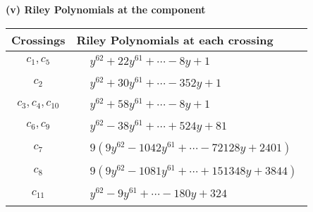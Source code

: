 \documentclass[1p]{elsarticle_modified}
\theoremstyle{definition}
\begin{document}
\flushleft \textbf{(v) Riley Polynomials at the component}\newline \\
\begin{tabular}{m{50pt}|m{274pt}}
Crossings & \hspace{64pt}Riley Polynomials at each crossing \\
\hline $$\begin{aligned}c_{1},c_{5}\end{aligned}$$&$\begin{aligned}
&y^{62}+22 y^{61}+\cdots-8 y+1
\end{aligned}$\\
\hline $$\begin{aligned}c_{2}\end{aligned}$$&$\begin{aligned}
&y^{62}+30 y^{61}+\cdots-352 y+1
\end{aligned}$\\
\hline $$\begin{aligned}c_{3},c_{4},c_{10}\end{aligned}$$&$\begin{aligned}
&y^{62}+58 y^{61}+\cdots-8 y+1
\end{aligned}$\\
\hline $$\begin{aligned}c_{6},c_{9}\end{aligned}$$&$\begin{aligned}
&y^{62}-38 y^{61}+\cdots+524 y+81
\end{aligned}$\\
\hline $$\begin{aligned}c_{7}\end{aligned}$$&$\begin{aligned}
&9(9 y^{62}-1042 y^{61}+\cdots-72128 y+2401)
\end{aligned}$\\
\hline $$\begin{aligned}c_{8}\end{aligned}$$&$\begin{aligned}
&9(9 y^{62}-1081 y^{61}+\cdots+151348 y+3844)
\end{aligned}$\\
\hline $$\begin{aligned}c_{11}\end{aligned}$$&$\begin{aligned}
&y^{62}-9 y^{61}+\cdots-180 y+324
\end{aligned}$\\
\hline
\end{tabular}\\~\\
\end{document}
